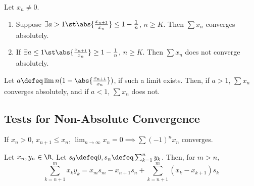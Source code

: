 \begin{proposition}
    Let $x_n \neq 0$. 
    \begin{enumerate}
        \item Suppose $\exists a > 1 \st \abs{\frac{x_{n+1}}{x_n}} \leq 1 - \frac{1}{n}$, $n \geq K$. Then $\sum x_n$ converges absolutely.
        \item If $\exists a \leq 1 \st \abs{\frac{x_{n+1}}{x_n}} \geq 1 - \frac{1}{n}$, $n \geq K$. Then $\sum x_n$ does not converge absolutely.
    \end{enumerate}
\end{proposition}

\begin{corollary}
    Let $a \defeq \lim n(1 - \abs{\frac{x_{n+1}}{x_n}})$, if such a limit exists. Then, if $a > 1$, $\sum x_n$ converges absolutely, and if $a < 1$, $\sum x_n$ does not.
\end{corollary}

\subsection{Tests for Non-Absolute Convergence}
\begin{proposition}
    If $x_n > 0$, $x_{n+1} \leq x_n$, $\lim_{n \to \infty} x_n = 0 \implies \sum (-1)^n x_n$ converges.
\end{proposition}

\begin{lemma}
    Let $x_n,y_n \in \R$. Let $s_0 \defeq 0, s_n \defeq \sum_{k=1}^n y_k$. Then, for $m > n$, \[
    \sum_{k=n+1}^m x_k y_k = x_m s_m - x_{n+1} s_{n}     + \sum_{k=n+1}^m (x_k - x_{k+1}) s_k
    \]
\end{lemma}